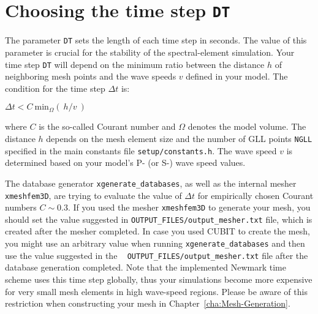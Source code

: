 \section{Choosing the time step \texttt{DT}}\label{sec:Choosing-the-Time-Step}

The parameter \texttt{DT} sets the length of each time step in seconds.
The value of this parameter is crucial for the stability of the spectral-element
simulation. Your time step \texttt{DT} will depend on the minimum
ratio between the distance $h$ of neighboring mesh points and the
wave speeds $v$ defined in your model. The condition for the time
step $\Delta t$ is:
\begin{lyxcode}
$\Delta t<C~\mathrm{min}_{\Omega}(~h/v~)$
\end{lyxcode}
where $C$ is the so-called Courant number and $\Omega$ denotes the
model volume. The distance $h$ depends on the mesh element size and
the number of GLL points \texttt{NGLL} specified in the main constants
file \texttt{setup/constants.h}. The wave speed $v$ is determined based on your model's P- (or S-)
wave speed values.

The database generator \texttt{xgenerate\_databases}, as well as the
internal mesher \texttt{xmeshfem3D}, are trying to evaluate the value
of $\Delta t$ for empirically chosen Courant numbers $C\sim0.3$.
If you used the mesher \texttt{xmeshfem3D} to generate your mesh,
you should set the value suggested in \texttt{OUTPUT\_FILES/output\_mesher.txt}
file, which is created after the mesher completed. In case you used
CUBIT to create the mesh, you might use an arbitrary value when running
\texttt{xgenerate\_databases} and then use the value suggested in
the ~\newline
 \texttt{OUTPUT\_FILES/output\_mesher.txt} file after the database
generation completed. Note that the implemented Newmark time scheme
uses this time step globally, thus your simulations become more expensive
for very small mesh elements in high wave-speed regions. Please be
aware of this restriction when constructing your mesh in Chapter~\ref{cha:Mesh-Generation}.

